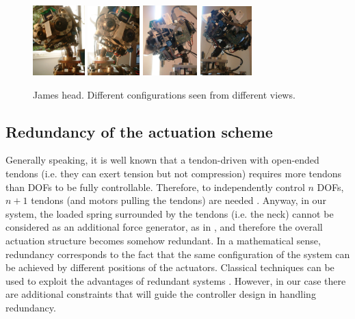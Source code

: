 \documentclass[conference]{IEEEtran}
\numberwithin{equation}{section}
\begin{document}
\begin{figure}[tbp]
\centering
\includegraphics[width=20mm]{image/HeadRight.jpg} \hspace{1pt}
\includegraphics[width=20mm]{image/HeadLeft.jpg} \hspace{1pt}
\includegraphics[width=21mm]{image/HeadAhead.jpg} \hspace{1pt}
\includegraphics[width=20mm]{image/HeadBack.jpg} \hspace{1pt}\\

\caption{James head. Different configurations seen from different views.}
\label{Fig:HeadPos}
\end{figure}


\subsection{Redundancy of the actuation scheme}

Generally speaking, it is well known that a tendon-driven with open-ended tendons (i.e. they can exert tension but not compression) requires more tendons than DOFs to be fully controllable. Therefore, to independently control $n$ DOFs, $n+1$ tendons (and motors pulling the tendons) are needed \cite{Tsai}. Anyway, in our system, the loaded spring surrounded by the tendons (i.e. the neck) cannot be considered as an additional force generator, as in \cite{Rovetta77}, and therefore the overall actuation structure becomes somehow redundant. In a mathematical sense, redundancy corresponds to the fact that the same configuration of the system can be achieved by different positions of the actuators. Classical techniques can be used to exploit the advantages of redundant systems \cite{SamsonEspiau}. However, in our case there are additional constraints that will guide the controller design in handling redundancy. 
\end{document}
